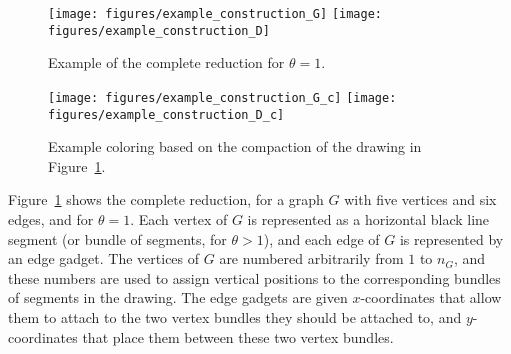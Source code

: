 \documentclass[12pt]{article}
\theoremstyle{definitions}
\begin{document}
\begin{figure}[t]
\centering
\texttt{[image: figures/example\_construction\_G]}\hfill
\texttt{[image: figures/example\_construction\_D]}
\caption{Example of the complete reduction for $\theta=1$.}
\label{fig:vvredux}
\end{figure}

\begin{figure}[t]
\centering
\texttt{[image: figures/example\_construction\_G\_c]}\hfill
\texttt{[image: figures/example\_construction\_D\_c]}
\caption{Example coloring based on the compaction of the drawing in Figure~\ref{fig:vvredux}.}
\label{fig:vvredux-c}
\end{figure}

Figure~\ref{fig:vvredux} shows the complete reduction, for a graph $G$ with five vertices and six edges, and for $\theta=1$. Each vertex of $G$ is represented as a horizontal black line segment (or bundle of segments, for $\theta>1$), and each edge of $G$ is represented by an edge gadget. The vertices of $G$ are numbered arbitrarily from $1$ to $n_G$, and these numbers are used to assign vertical positions to the corresponding bundles of segments in the drawing. The edge gadgets are given $x$-coordinates that allow them to attach to the two vertex bundles they should be attached to, and $y$-coordinates that place them between these two vertex bundles.
\end{document}
